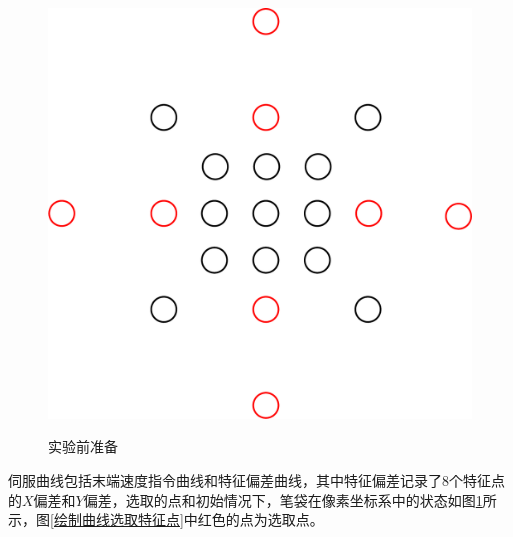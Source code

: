 \documentclass[fontset=fandol,type=bachelor,campus=harbin,bsmainpagenumberline=true]{hithesisbook}
\begin{document}
\begin{figure}[h]
{\begin{minipage}[h]{0.36\textwidth}
			\includegraphics[width=1\textwidth]{chapter5/绘制曲线选取特征点}
		\end{minipage}
		\label{绘制曲线选取特征点}
	}
	\caption{实验前准备}
	\label{实验前准备}
\end{figure}
伺服曲线包括末端速度指令曲线和特征偏差曲线，其中特征偏差记录了8个特征点的$X$偏差和$Y$偏差，选取的点和初始情况下，笔袋在像素坐标系中的状态如图\ref{实验前准备}所示，图\ref{绘制曲线选取特征点}中红色的点为选取点。
\end{document}
